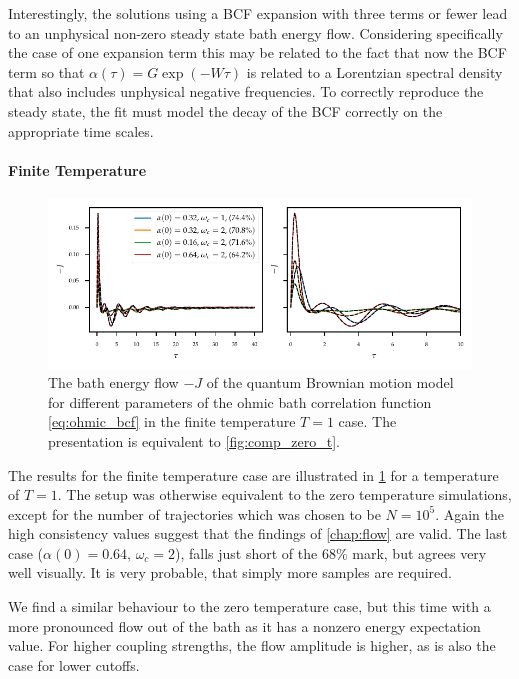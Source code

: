 Interestingly, the solutions using a BCF expansion with three terms or
fewer lead to an unphysical non-zero steady state bath energy
flow. Considering specifically the case of one expansion term this may
be related to the fact that now the BCF term so that
\(α(τ)=G \exp(-Wτ)\) is related to a Lorentzian spectral density that
also includes unphysical negative frequencies. To correctly reproduce
the steady state, the fit must model the decay of the BCF correctly on
the appropriate time scales.

\paragraph{Finite Temperature}
\begin{figure}[t]
  \centering
  \includegraphics{figs/analytic_comp/flow_comp_nonzero.pdf}
  \caption{\label{fig:comp_finite_t} The bath energy flow \(-J\) of
    the quantum Brownian motion model for different parameters of the
    ohmic bath correlation function \cref{eq:ohmic_bcf} in the finite
    temperature \(T=1\) case. The presentation is equivalent to
    \cref{fig:comp_zero_t}.}
\end{figure}
The results for the finite temperature case are illustrated in
\cref{fig:comp_finite_t} for a temperature of \(T=1\). The setup was
otherwise equivalent to the zero temperature simulations, except for
the number of trajectories which was chosen to be \(N=10^5\).  Again
the high consistency values suggest that the findings of
\cref{chap:flow} are valid. The last case (\(α(0)=0.64,\, ω_c=2\)),
falls just short of the \(68\%\) mark, but agrees very well
visually. It is very probable, that simply more samples are
required.

We find a similar behaviour to the zero temperature case, but this
time with a more pronounced flow out of the bath as it has a nonzero
energy expectation value. For higher coupling strengths, the flow
amplitude is higher, as is also the case for lower cutoffs.

